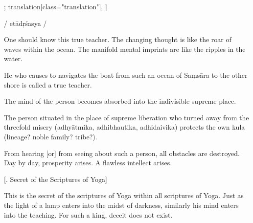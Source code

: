 \begin{alignment}[
  texts=edition[class="edition"];
  translation[class="translation"],
  ]
\begin{edition}
\begin{prose}
/
etādṛśasya
/
\end{prose}
  \end{edition}
  \begin{translation}
    \begin{tlate}
      \noindent
One should know this true teacher. The changing thought is like the roar of waves within the ocean. The manifold mental imprints are like the ripples in the water.

He who causes to navigates the boat from such an ocean of Saṃsāra to the other shore is called a true teacher.

The mind of the person becomes absorbed into the indivisible supreme place.

The person situated in the place of supreme liberation who turned away from the threefold misery (adhyātmika, adhibhautika, adhidaivika) protects the own kula (lineage? noble family? tribe?).

From hearing [or] from seeing about such a person, all obstacles are destroyed. Day by day, prosperity arises. A flawless intellect arises.
\end{tlate}
\bigskip
\begin{tlate}
\centerline{\textrm{\small{[. Secret of the Scriptures of Yoga]}}}
\label{secretofscriptures}
\bigskip
This is the secret of the scriptures of Yoga within all scriptures of Yoga. Just as the light of a lamp enters into the midst of darkness, similarly his mind enters into the teaching. For such a king, deceit does not exist. 


\end{tlate}
\end{translation}
\end{alignment}
